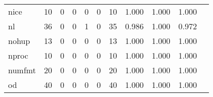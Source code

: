 \begin{longtable}{lp{1.2cm}p{1.2cm}p{1.2cm}p{1.2cm}p{1.2cm}p{1.2cm}p{1.2cm}p{1.2cm}p{1.2cm}p{1.2cm}}
nice      &                                    10 &                                                  0 &                                                  0 &                                                  0 &                                                  0 &                                                 10 &                                         1.000 &                                              1.000 &                                              1.000 \\
nl        &                                    36 &                                                  0 &                                                  0 &                                                  1 &                                                  0 &                                                 35 &                                         0.986 &                                              1.000 &                                              0.972 \\
nohup     &                                    13 &                                                  0 &                                                  0 &                                                  0 &                                                  0 &                                                 13 &                                         1.000 &                                              1.000 &                                              1.000 \\
nproc     &                                    10 &                                                  0 &                                                  0 &                                                  0 &                                                  0 &                                                 10 &                                         1.000 &                                              1.000 &                                              1.000 \\
numfmt    &                                    20 &                                                  0 &                                                  0 &                                                  0 &                                                  0 &                                                 20 &                                         1.000 &                                              1.000 &                                              1.000 \\
od        &                                    40 &                                                  0 &                                                  0 &                                                  0 &                                                  0 &                                                 40 &                                         1.000 &                                              1.000 &                                              1.000 \\

\end{longtable}
